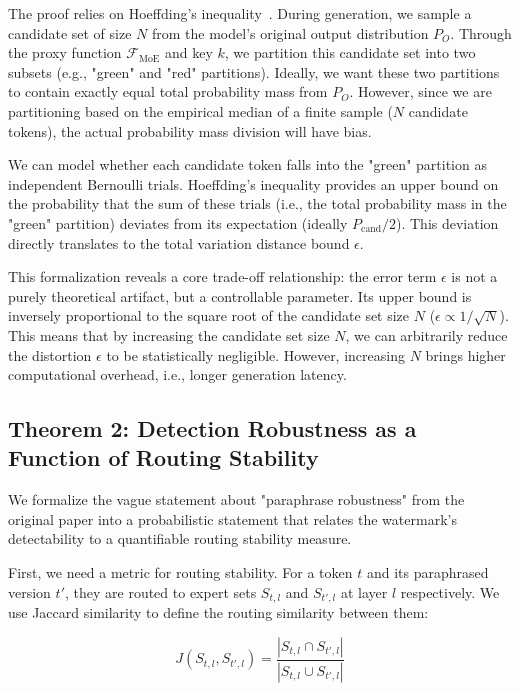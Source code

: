 \documentclass[letterpaper,twocolumn,10pt]{article}
\begin{document}
The proof relies on Hoeffding's inequality~\cite{hoeffding1963probability}. During generation, we sample a candidate set of size $N$ from the model's original output distribution $P_O$. Through the proxy function $\mathcal{F}_{\text{MoE}}$ and key $k$, we partition this candidate set into two subsets (e.g., "green" and "red" partitions). Ideally, we want these two partitions to contain exactly equal total probability mass from $P_O$. However, since we are partitioning based on the empirical median of a finite sample ($N$ candidate tokens), the actual probability mass division will have bias.

We can model whether each candidate token falls into the "green" partition as independent Bernoulli trials. Hoeffding's inequality provides an upper bound on the probability that the sum of these trials (i.e., the total probability mass in the "green" partition) deviates from its expectation (ideally $P_{\text{cand}}/2$). This deviation directly translates to the total variation distance bound $\epsilon$.

This formalization reveals a core trade-off relationship: the error term $\epsilon$ is not a purely theoretical artifact, but a controllable parameter. Its upper bound is inversely proportional to the square root of the candidate set size $N$ ($\epsilon \propto 1/\sqrt{N}$). This means that by increasing the candidate set size $N$, we can arbitrarily reduce the distortion $\epsilon$ to be statistically negligible. However, increasing $N$ brings higher computational overhead, i.e., longer generation latency.

\subsection{Theorem 2: Detection Robustness as a Function of Routing Stability}

We formalize the vague statement about "paraphrase robustness" from the original paper into a probabilistic statement that relates the watermark's detectability to a quantifiable routing stability measure.

First, we need a metric for routing stability. For a token $t$ and its paraphrased version $t'$, they are routed to expert sets $S_{t,l}$ and $S_{t',l}$ at layer $l$ respectively. We use Jaccard similarity to define the routing similarity between them:

\begin{equation}
J(S_{t,l}, S_{t',l}) = \frac{|S_{t,l} \cap S_{t',l}|}{|S_{t,l} \cup S_{t',l}|}
\end{equation}
\end{document}
